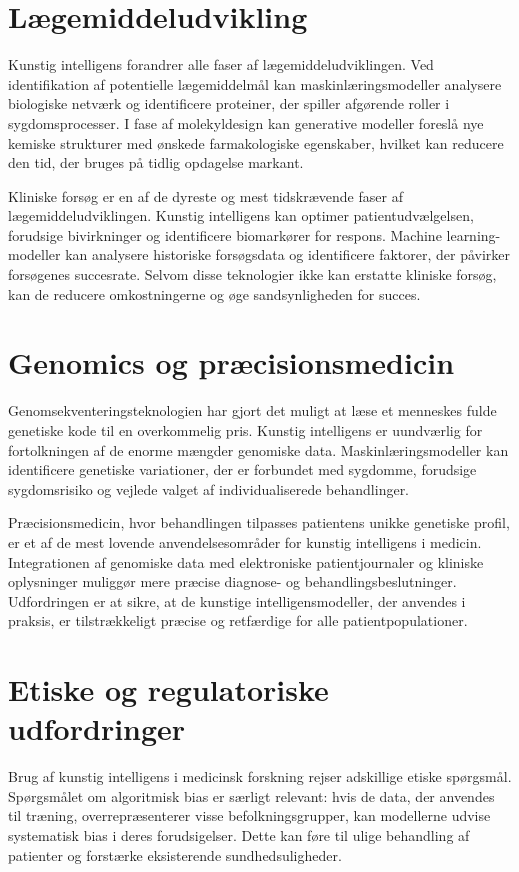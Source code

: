 \documentclass[
    language=danish,
    doctype=article,
]{../../omnilatex}
\begin{document}
\section{Lægemiddeludvikling}
Kunstig intelligens forandrer alle faser af lægemiddeludviklingen. Ved identifikation af potentielle lægemiddelmål kan maskinlæringsmodeller analysere biologiske netværk og identificere proteiner, der spiller afgørende roller i sygdomsprocesser. I fase af molekyldesign kan generative modeller foreslå nye kemiske strukturer med ønskede farmakologiske egenskaber, hvilket kan reducere den tid, der bruges på tidlig opdagelse markant.

Kliniske forsøg er en af de dyreste og mest tidskrævende faser af lægemiddeludviklingen. Kunstig intelligens kan optimer patientudvælgelsen, forudsige bivirkninger og identificere biomarkører for respons. Machine learning-modeller kan analysere historiske forsøgsdata og identificere faktorer, der påvirker forsøgenes succesrate. Selvom disse teknologier ikke kan erstatte kliniske forsøg, kan de reducere omkostningerne og øge sandsynligheden for succes.

\section{Genomics og præcisionsmedicin}
Genomsekventeringsteknologien har gjort det muligt at læse et menneskes fulde genetiske kode til en overkommelig pris. Kunstig intelligens er uundværlig for fortolkningen af de enorme mængder genomiske data. Maskinlæringsmodeller kan identificere genetiske variationer, der er forbundet med sygdomme, forudsige sygdomsrisiko og vejlede valget af individualiserede behandlinger.

Præcisionsmedicin, hvor behandlingen tilpasses patientens unikke genetiske profil, er et af de mest lovende anvendelsesområder for kunstig intelligens i medicin. Integrationen af genomiske data med elektroniske patientjournaler og kliniske oplysninger muliggør mere præcise diagnose- og behandlingsbeslutninger. Udfordringen er at sikre, at de kunstige intelligensmodeller, der anvendes i praksis, er tilstrækkeligt præcise og retfærdige for alle patientpopulationer.

\section{Etiske og regulatoriske udfordringer}
Brug af kunstig intelligens i medicinsk forskning rejser adskillige etiske spørgsmål. Spørgsmålet om algoritmisk bias er særligt relevant: hvis de data, der anvendes til træning, overrepræsenterer visse befolkningsgrupper, kan modellerne udvise systematisk bias i deres forudsigelser. Dette kan føre til ulige behandling af patienter og forstærke eksisterende sundhedsuligheder.
\end{document}
